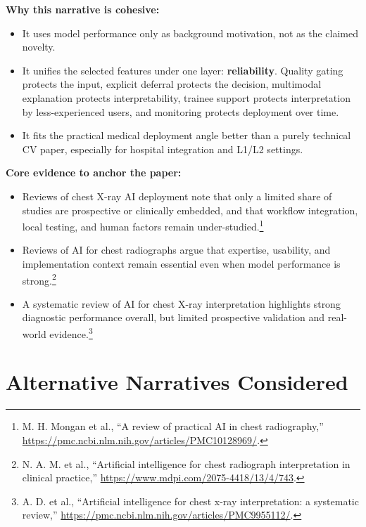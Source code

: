 \documentclass[11pt]{article}
\begin{document}
\textbf{Why this narrative is cohesive:}
\begin{itemize}[leftmargin=1.5em]
    \item It uses model performance only as background motivation, not as the claimed novelty.
    \item It unifies the selected features under one layer: \textbf{reliability}. Quality gating protects the input, explicit deferral protects the decision, multimodal explanation protects interpretability, trainee support protects interpretation by less-experienced users, and monitoring protects deployment over time.
    \item It fits the practical medical deployment angle better than a purely technical CV paper, especially for hospital integration and L1/L2 settings.
\end{itemize}

\textbf{Core evidence to anchor the paper:}
\begin{itemize}[leftmargin=1.5em]
    \item Reviews of chest X-ray AI deployment note that only a limited share of studies are prospective or clinically embedded, and that workflow integration, local testing, and human factors remain under-studied.\footnote{M. H. Mongan et al., ``A review of practical AI in chest radiography,'' \url{https://pmc.ncbi.nlm.nih.gov/articles/PMC10128969/}.}
    \item Reviews of AI for chest radiographs argue that expertise, usability, and implementation context remain essential even when model performance is strong.\footnote{N. A. M. et al., ``Artificial intelligence for chest radiograph interpretation in clinical practice,'' \url{https://www.mdpi.com/2075-4418/13/4/743}.}
    \item A systematic review of AI for chest X-ray interpretation highlights strong diagnostic performance overall, but limited prospective validation and real-world evidence.\footnote{A. D. et al., ``Artificial intelligence for chest x-ray interpretation: a systematic review,'' \url{https://pmc.ncbi.nlm.nih.gov/articles/PMC9955112/}.}
\end{itemize}

\section{Alternative Narratives Considered}
\end{document}
